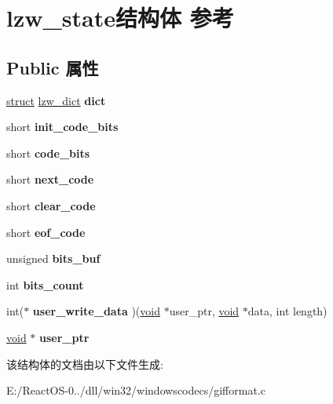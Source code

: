 \hypertarget{structlzw__state}{}\section{lzw\+\_\+state结构体 参考}
\label{structlzw__state}
\subsection*{Public 属性}
\begin{DoxyCompactItemize}
\item 
\mbox{\label{structlzw__state_acf5aec5d867dda05008f1971fd43d10a}} 
\hyperlink{interfacestruct}{struct} \hyperlink{structlzw__dict}{lzw\+\_\+dict} {\bfseries dict}
\item 
\mbox{\label{structlzw__state_a75aa8f50ca9333729a3267ed92deb5ce}} 
short {\bfseries init\+\_\+code\+\_\+bits}
\item 
\mbox{\label{structlzw__state_ad17386ce2878c2eaa71ce3545d489395}} 
short {\bfseries code\+\_\+bits}
\item 
\mbox{\label{structlzw__state_adfaa67085075c6c16241b352aea0e1e8}} 
short {\bfseries next\+\_\+code}
\item 
\mbox{\label{structlzw__state_ac06d49b91efcb31615e1110391a0ef7c}} 
short {\bfseries clear\+\_\+code}
\item 
\mbox{\label{structlzw__state_a9fd2ca22d5a309eb3c04abebd1895f07}} 
short {\bfseries eof\+\_\+code}
\item 
\mbox{\label{structlzw__state_a61fa8d5a17978771ad2ba7dd859358e9}} 
unsigned {\bfseries bits\+\_\+buf}
\item 
\mbox{\label{structlzw__state_a3bf327bae935531ba9db66d1117675da}} 
int {\bfseries bits\+\_\+count}
\item 
\mbox{\label{structlzw__state_a836e26aa234c387732f477130a00aa43}} 
int($\ast$ {\bfseries user\+\_\+write\+\_\+data} )(\hyperlink{interfacevoid}{void} $\ast$user\+\_\+ptr, \hyperlink{interfacevoid}{void} $\ast$data, int length)
\item 
\mbox{\label{structlzw__state_a78bf3c36fa8d5e76cb3323feedfe8fcc}} 
\hyperlink{interfacevoid}{void} $\ast$ {\bfseries user\+\_\+ptr}
\end{DoxyCompactItemize}


该结构体的文档由以下文件生成\+:\begin{DoxyCompactItemize}
\item 
E\+:/\+React\+O\+S-\/0../dll/win32/windowscodecs/gifformat.\+c\end{DoxyCompactItemize}
